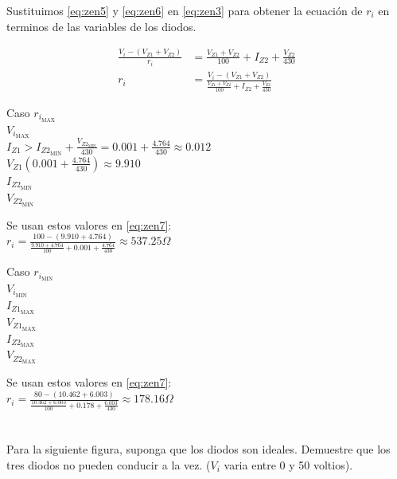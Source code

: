 \documentclass[12pt]{article}
\begin{document}
Sustituimos \ref{eq:zen5} y \ref{eq:zen6} en \ref{eq:zen3} para obtener la
ecuación de $r_i$ en terminos de las variables de los diodos.

\begin{align}
  \frac{V_i - (V_{Z1}+V_{Z2})}{r_i} &= \frac{V_{Z1} + V_{Z2}}{100} + I_{Z2} + \frac{V_{Z2}}{430} \nonumber \\
  r_i &= \frac{V_i - (V_{Z1}+V_{Z2})}{\frac{V_{Z1} + V_{Z2}}{100} + I_{Z2} + \frac{V_{Z2}}{430}} \label{eq:zen7}
\end{align}

Caso $r_{i_{\mathrm{MAX}}}$\\
$V_{i_{\mathrm{MAX}}}$\\
$I_{Z1} > I_{Z2_{\mathrm{MIN}}} + \frac{V_{Z2_{\mathrm{MIN}}}}{430} = 0.001 + \frac{4.764}{430} \approx 0.012$\\
$V_{Z1}(0.001 + \frac{4.764}{430}) \approx 9.910$\\
$I_{Z2_{\mathrm{MIN}}}$\\
$V_{Z2_{\mathrm{MIN}}}$


Se usan estos valores en \ref{eq:zen7}:\\
$r_i = \frac{100 - (9.910+4.764)}{\frac{9.910+4.764}{100} + 0.001 + \frac{4.764}{430}} \approx 537.25\Omega$

\bigskip

Caso $r_{i_{\mathrm{MIN}}}$\\
$V_{i_{\mathrm{MIN}}}$\\
$I_{Z1_{\mathrm{MAX}}}$\\
$V_{Z1_{\mathrm{MAX}}}$\\
$I_{Z2_{\mathrm{MAX}}}$\\
$V_{Z2_{\mathrm{MAX}}}$

Se usan estos valores en \ref{eq:zen7}:\\
$r_i = \frac{80 - (10.462+6.003)}{\frac{10.462+6.003}{100} + 0.178 + \frac{6.003}{430}} \approx 178.16\Omega$

\newpage
\section{}

Para la siguiente figura, suponga que los diodos son ideales. Demuestre que los
tres diodos no pueden conducir a la vez. ($V_i$ varia entre 0 y 50 voltios).
\end{document}
